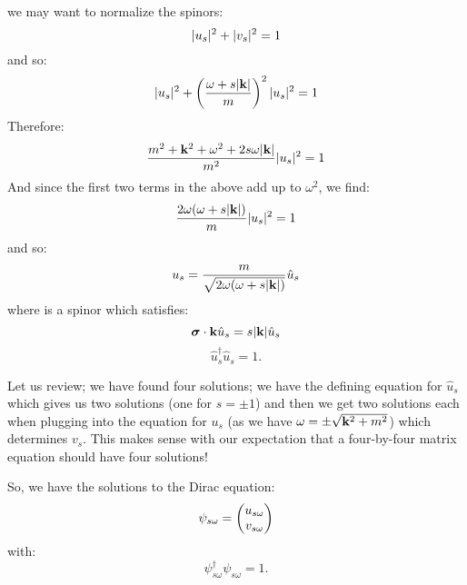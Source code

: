 we may want to normalize the spinors:
\begin{equation}
    \lvert u_s \rvert^2 + \lvert v_s \rvert^2 = 1
\end{equation}
and so:
\begin{equation}
    \lvert u_s \rvert^2 + \left(\frac{\omega + s\lvert \mathbf{k} \rvert}{m}\right)^2 \lvert u_s \rvert^2 = 1
\end{equation}
Therefore:
\begin{equation}
    \frac{m^2 + \mathbf{k}^2 + \omega^2 + 2s\omega\lvert \mathbf{k} \rvert}{m^2}\lvert u_s \rvert^2 = 1
\end{equation}
And since the first two terms in the above add up to $\omega^2$, we find:
\begin{equation}
    \frac{2\omega(\omega + s\lvert \mathbf{k} \rvert)}{m}\lvert u_s \rvert^2 = 1
\end{equation}
and so:
\begin{equation}
    u_s = \frac{m}{\sqrt{2\omega(\omega + s\lvert \mathbf{k} \rvert)}}\hat{u}_s
\end{equation}
where is a spinor which satisfies:
\begin{equation}
    \mbox{\boldmath$ \sigma $} \cdot \mathbf{k} \hat{u}_s = s\lvert \mathbf{k} \rvert\hat{u}_s
\end{equation}
\begin{equation}
    \hat{u}_s^\dag \hat{u}_s = 1.
\end{equation}

Let us review; we have found four solutions; we have the defining equation for $\hat{u}_s$ which gives us two solutions 
(one for $s = \pm 1$) and then we get two solutions each when plugging into the equation for $u_s$ (as we have $\omega = \pm \sqrt{\mathbf{k}^2 + m^2}$) which determines $v_s$. This makes sense with our expectation that a four-by-four matrix equation should have four solutions!

So, we have the solutions to the Dirac equation:
\begin{equation}
    \psi_{s\omega} = \begin{pmatrix}u_{s\omega} \\ v_{s\omega}\end{pmatrix}
\end{equation}
with:
\begin{equation}
    \psi^\dag_{s\omega}\psi_{s\omega} = 1.
\end{equation}

